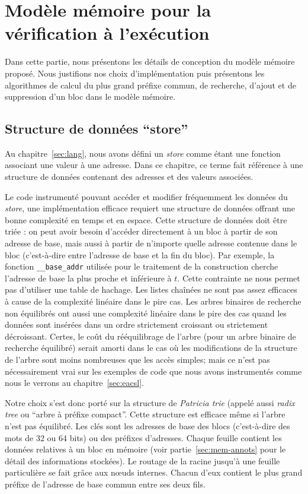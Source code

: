 \section{Modèle mémoire pour la vérification à l'exécution}
\label{sec:mem-model}


Dans cette partie, nous présentons les détails de conception du modèle mémoire
proposé.
Nous justifions nos choix d'implémentation puis présentons les algorithmes de
calcul du plus grand préfixe commun, de recherche, d'ajout et de suppression
d'un bloc dans le modèle mémoire.


\subsection{Structure de données ``store''}


Au chapitre~\ref{sec:lang}, nous avons défini un {\em store} comme étant une
fonction associant une valeur à une adresse.
Dans ce chapitre, ce terme fait référence à une structure de données contenant
des adresses et des valeurs associées.

Le code instrumenté pouvant accéder et modifier fréquemment les données du
\textit{store}, une implémentation efficace requiert une structure de données
offrant une bonne complexité en temps et en espace.
Cette structure de données doit être triée : on peut avoir besoin d'accéder
directement à un bloc à partir de son adresse de base, mais aussi à partir de
n'importe quelle adresse contenue dans le bloc (c'est-à-dire entre l'adresse de
base et la fin du bloc).
Par exemple, la fonction \lstinline'__base_addr' utilisée pour le traitement
de la construction \baseaddrt cherche l'adresse de base la plus proche et
inférieure à $t$.
Cette contrainte ne nous permet pas d'utiliser une table de hachage.
Les listes chaînées ne sont pas assez efficaces à cause de la complexité
linéaire dans le pire cas.
Les arbres binaires de recherche non équilibrés ont aussi une complexité
linéaire dans le pire des cas quand les données sont insérées dans un ordre
strictement croissant ou strictement décroissant.
Certes, le coût du rééquilibrage de l'arbre (pour un arbre binaire de recherche
équilibré) serait amorti dans le cas où les modifications de la structure de
l'arbre sont moins nombreuses que les accès simples; mais ce n'est pas
nécessairement vrai sur les exemples de code que nous avons instrumentés comme
nous le verrons au chapitre~\ref{sec:eacsl}.

Notre choix s'est donc porté sur la structure de {\em Patricia trie}
\cite{Szpankowski/90} (appelé aussi {\em radix tree} ou ``arbre à préfixe
compact''.
Cette structure est efficace même si l'arbre n'est pas équilibré.
Les clés sont les adresses de base des blocs (c'est-à-dire des mots de 32 ou 64
bits) ou des préfixes d'adresses.
Chaque feuille contient les données relatives à un bloc en mémoire (voir
partie~\ref{sec:mem-annots} pour le détail des informations stockées).
Le routage de la racine jusqu'à une feuille particulière se fait grâce aux
n\oe{}uds internes.
Chacun d'eux contient le plus grand préfixe de l'adresse de base commun entre
ses deux fils.

